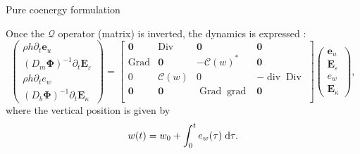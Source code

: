 \documentclass[aspectratio=169]{beamer}
\DeclareMathOperator*{\grad}{grad}
\DeclareMathOperator*{\Grad}{Grad}
\DeclareMathOperator*{\Div}{Div}
\renewcommand{\div}{\operatorname{div}}
\begin{document}
\begin{frame}{Pure coenergy formulation}
	
	\begin{tcolorbox}[nobeforeafter, colframe=theme,title=Incorporation of the constitutive equations]
		Once the $\mathcal{Q}$ operator (matrix) is inverted, the dynamics is expressed :
		\begin{equation*}
			\begin{pmatrix}
				\rho h\partial_t \bm{e}_u \\
				(D_m \bm{\Phi})^{-1} \partial_t \bm{E}_\varepsilon \\
				\rho h\partial_t e_w \\
				(D_b \bm{\Phi})^{-1} \partial_t \bm{E}_\kappa
			\end{pmatrix} = 
			\begin{bmatrix}
				\bm{0} & \Div & \bm{0} & \bm{0} \\
				\Grad & \bm{0} & -\mathcal{C}(w)^* & \bm{0} \\
				0 & \mathcal{C}(w) & 0 & -\div\Div \\
				\bm{0} & \bm{0} & \Grad\grad & \bm{0} \\ 
			\end{bmatrix}
			\begin{pmatrix}
				\bm{e}_u \\
				\bm{E}_\varepsilon \\
				e_w \\
				\bm{E}_\kappa
			\end{pmatrix},
		\end{equation*}
		where the vertical position is given by 
		\begin{equation*}
		w(t) = w_0 + \int_0^t e_w(\tau) \d\tau.
		\end{equation*}
	\end{tcolorbox}

	
\end{frame}
\end{document}
